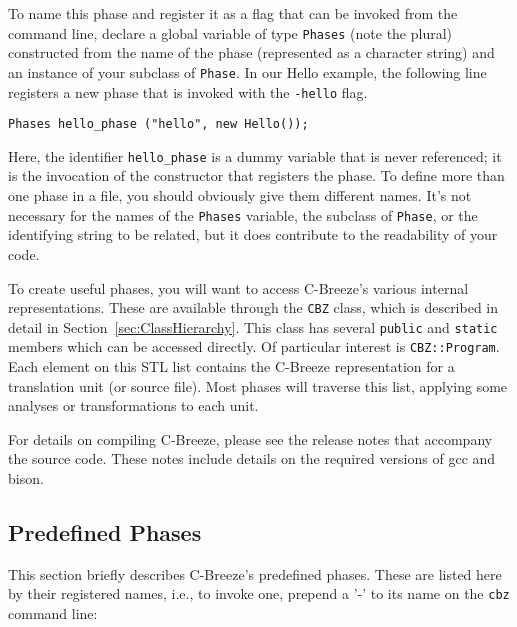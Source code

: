 \documentclass[10pt]{article}
\begin{document}
To name this phase and register it as a flag that can be invoked from the
command line, declare a global variable of type {\tt Phases} (note the
plural) constructed from the name of the phase (represented as a character
string) and an instance of your subclass of {\tt Phase}.  In our Hello
example, the following line registers a new phase that is invoked with the
{\tt -hello} flag.

\begin{small}
\begin{verbatim} 
Phases hello_phase ("hello", new Hello());
\end{verbatim} 
\end{small}

\noindent
Here, the identifier {\tt hello\_phase} is a dummy variable that is never
referenced; it is the invocation of the constructor that registers the
phase.  To define more than one phase in a file, you should obviously give
them different names.  It's not necessary for the names of the {\tt Phases}
variable, the subclass of {\tt Phase}, or the identifying string to be
related, but it does contribute to the readability of your code.


To create useful phases, you will want to access C-Breeze's various internal
representations.  These are available through the {\tt CBZ} class, which is
described in detail in Section~\ref{sec:ClassHierarchy}.  This class has
several {\tt public} and {\tt static} members which can be accessed
directly.  Of particular interest is {\tt CBZ::Program}.  Each element on
this STL list contains the C-Breeze representation for a translation unit (or
source file).  Most phases will traverse this list, applying some analyses or
transformations to each unit.

For details on compiling C-Breeze, please see the release notes that
accompany the source code.  These notes include details on the required
versions of gcc and bison.


\subsection{Predefined Phases}

This section briefly describes C-Breeze's predefined phases.  These are
listed here by their registered names, i.e., to invoke one, prepend a '-' to
its name on the {\tt cbz} command line:
\end{document}
